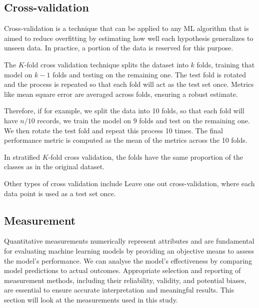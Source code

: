 	\subsection{Cross-validation}
	
		Cross-validation is a technique that can be applied to any ML algorithm that is aimed to reduce overfitting by estimating how well each hypothesis generalizes to unseen data. In practice, a portion of the data is reserved for this purpose.
		
		The $K$-fold cross validation technique splits the dataset into $k$ folds, training that model on $k-1$ folds and testing on the remaining one. The test fold is rotated and the process is repeated so that each fold will act as the test set once. Metrics like mean square error are averaged across folds, ensuring a robust estimate.
		
		Therefore, if for example, we split the data into 10 folds, so that each fold will have $n/10$ records, we train the model on 9 folds and test on the remaining one. We then rotate the test fold and repeat this process 10 times. The final performance metric is computed as the mean of the metrics across the 10 folds.
		
		In stratified $K$-fold cross validation, the folds have the same proportion of the classes as in the original dataset.
		
		Other types of cross validation include Leave one out cross-validation, where each data point is used as a test set once.
	
	
	
	
	
	\subsection{Measurement}
	
		Quantitative measurements numerically represent attributes and are fundamental for evaluating machine learning models by providing an objective means to assess the model's performance. We can analyse the model's effectiveness by comparing model predictions to actual outcomes. Appropriate selection and reporting of measurement methods, including their reliability, validity, and potential biases, are essential to ensure accurate interpretation and meaningful results. This section will look at the measurements used in this study.
		
